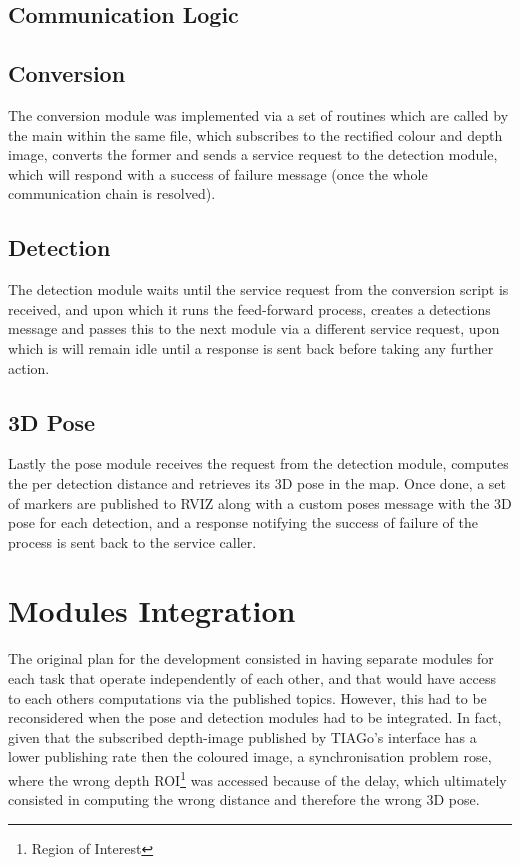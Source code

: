 \subsection{Communication Logic}

\subsection{Conversion}

The conversion module was implemented via a set of routines which are called by the main within the same file, which subscribes to the rectified colour and depth image, converts the former and sends a service request to the detection module, which will respond with a success of failure message (once the whole communication chain is resolved).

\subsection{Detection}

The detection module waits until the service request from the conversion script is received, and upon which it runs the feed-forward process, creates a detections message and passes this to the next module via a different service request, upon which is will remain idle until a response is sent back before taking any further action.

\subsection{3D Pose}

Lastly the pose module receives the request from the detection module, computes the per detection distance and retrieves its 3D pose in the map. Once done, a set of markers are published to RVIZ along with a custom poses message with the 3D pose for each detection, and a response notifying the success of failure of the process is sent back to the service caller.

\section{Modules Integration}

The original plan for the development consisted in having separate modules for each task that operate independently of each other, and that would have access to each others computations via the published topics. However, this had to be reconsidered when the pose and detection modules had to be integrated. In fact, given that the subscribed depth-image published by TIAGo's interface has a lower publishing rate then the coloured image, a synchronisation problem rose, where the wrong depth ROI\footnote{Region of Interest} was accessed because of the delay, which ultimately consisted in computing the wrong distance and therefore the wrong 3D pose.

